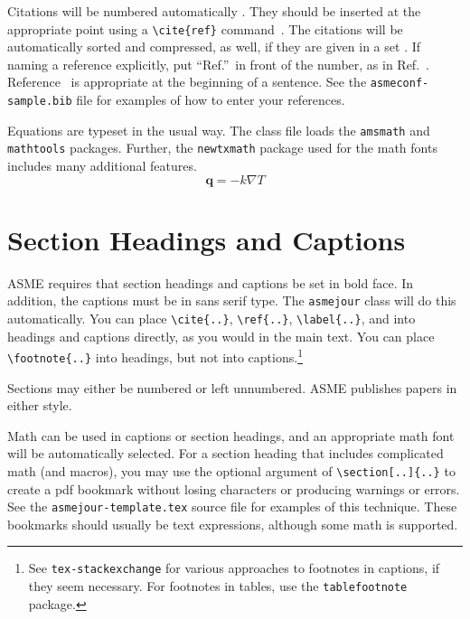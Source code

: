 \documentclass[subscriptcorrection,upint,varvw,barcolor=Goldenrod3,mathalfa=cal=euler,balance,hyphenate,french,pdf-a]{asmejour} %
\begin{document}
Citations will be numbered automatically \cite{DKE1969}. They should be inserted at the appropriate point using a \verb|\cite{ref}| command~\cite{toohey2007,gibson2008}. The citations will be automatically sorted and compressed, as well, if they are given in a set \cite{stevens1999, DKE1969, wions2006, oligaria2011, mollen2014, smith2014, apple2019}. If naming a reference explicitly, put ``Ref.''\ in front of the number, as in Ref.~\cite{smith2014}. Reference~\cite{smith2014} is appropriate at the beginning of a sentence.
See the \texttt{asmeconf-sample.bib} file for examples of how to enter your references.

Equations are typeset in the usual way.  The class file loads the \texttt{amsmath} and \texttt{mathtools} packages. Further, the \texttt{newtxmath} package used for the math fonts includes many additional features.
\begin{equation}\label{eqn:1}
\mathbf{q} = -k\nabla T
\end{equation}


\section{Section Headings and Captions}

ASME requires that section headings and captions be set in bold face. In addition, the captions must be in sans serif type. The \texttt{asmejour} class will do this automatically.  You can place \verb|\cite{..}|, \verb|\ref{..}|, \verb|\label{..}|, and into headings and captions directly, as you would in the main text.  You can place \verb|\footnote{..}| into headings, but not into captions.\footnote{See \texttt{tex-stackexchange} for various approaches to footnotes in captions, if they seem necessary. For footnotes in tables, use the \texttt{tablefootnote} package.}

Sections may either be numbered or left unnumbered. ASME publishes papers in either style.

Math can be used in captions or section headings, and an appropriate math font will be automatically selected. For a section heading that includes complicated math (and macros), you may use the optional argument of \verb|\section[..]{..}| to create a pdf bookmark without losing characters or producing warnings or errors. See the \texttt{asmejour-template.tex} source file for examples of this technique. These bookmarks should usually be text expressions, although some math is supported.  
\end{document}
